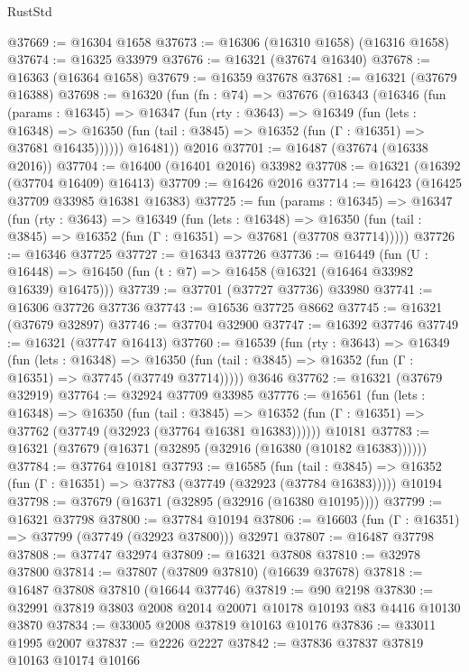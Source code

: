 \begin{lexlean}{RustStd}
\begin{coremodule}
@37669 := @16304 @1658
@37673 := @16306 (@16310 @1658) (@16316 @1658)
@37674 := @16325 @33979
@37676 := @16321 (@37674 @16340)
@37678 := @16363 (@16364 @1658)
@37679 := @16359 @37678
@37681 := @16321 (@37679 @16388)
@37698 := @16320
    (fun (fn : @74) =>
    @37676
      (@16343
        (@16346
          (fun (params : @16345) =>
          @16347
            (fun (rty : @3643) =>
            @16349
              (fun (lets : @16348) =>
              @16350 (fun (tail : @3845) => @16352 (fun (Γ : @16351) => @37681 @16435))))))
        @16481))
    @2016
@37701 := @16487 (@37674 (@16338 @2016))
@37704 := @16400 (@16401 @2016) @33982
@37708 := @16321 (@16392 (@37704 @16409) @16413)
@37709 := @16426 @2016
@37714 := @16423 (@16425 @37709 @33985 @16381 @16383)
@37725 := fun (params : @16345) =>
  @16347
    (fun (rty : @3643) =>
    @16349
      (fun (lets : @16348) =>
      @16350 (fun (tail : @3845) => @16352 (fun (Γ : @16351) => @37681 (@37708 @37714)))))
@37726 := @16346 @37725
@37727 := @16343 @37726
@37736 := @16449
    (fun (U : @16448) => @16450 (fun (t : @7) => @16458 (@16321 (@16464 @33982 @16339) @16475)))
@37739 := @37701 (@37727 @37736) @33980
@37741 := @16306 @37726 @37736
@37743 := @16536 @37725 @8662
@37745 := @16321 (@37679 @32897)
@37746 := @37704 @32900
@37747 := @16392 @37746
@37749 := @16321 (@37747 @16413)
@37760 := @16539
    (fun (rty : @3643) =>
    @16349
      (fun (lets : @16348) =>
      @16350 (fun (tail : @3845) => @16352 (fun (Γ : @16351) => @37745 (@37749 @37714)))))
    @3646
@37762 := @16321 (@37679 @32919)
@37764 := @32924 @37709 @33985
@37776 := @16561
    (fun (lets : @16348) =>
    @16350
      (fun (tail : @3845) =>
      @16352 (fun (Γ : @16351) => @37762 (@37749 (@32923 (@37764 @16381 @16383))))))
    @10181
@37783 := @16321 (@37679 (@16371 (@32895 (@32916 (@16380 (@10182 @16383))))))
@37784 := @37764 @10181
@37793 := @16585
    (fun (tail : @3845) => @16352 (fun (Γ : @16351) => @37783 (@37749 (@32923 (@37784 @16383)))))
    @10194
@37798 := @37679 (@16371 (@32895 (@32916 (@16380 @10195))))
@37799 := @16321 @37798
@37800 := @37784 @10194
@37806 := @16603 (fun (Γ : @16351) => @37799 (@37749 (@32923 @37800))) @32971
@37807 := @16487 @37798
@37808 := @37747 @32974
@37809 := @16321 @37808
@37810 := @32978 @37800
@37814 := @37807 (@37809 @37810) (@16639 @37678)
@37818 := @16487 @37808 @37810 (@16644 @37746)
@37819 := @90 @2198
@37830 := @32991 @37819 @3803 @2008 @2014 @20071 @10178 @10193 @83 @4416 @10130 @3870
@37834 := @33005 @2008 @37819 @10163 @10176
@37836 := @33011 @1995 @2007
@37837 := @2226 @2227
@37842 := @37836 @37837 @37819 @10163 @10174 @10166

\end{coremodule}
\end{lexlean}
